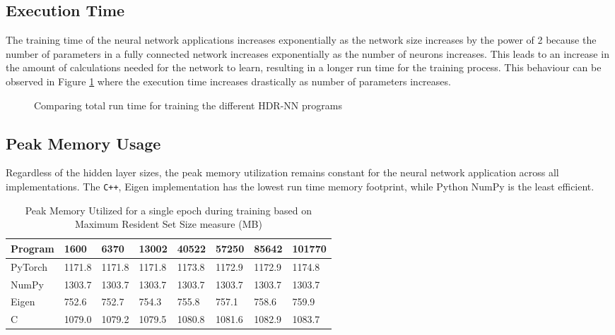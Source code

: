 \subsection{Execution Time}
The training time of the neural network applications increases exponentially as the network size increases by the power of 2 because the number of parameters in a fully connected network increases exponentially as the number of neurons increases. This leads to an increase in the amount of calculations needed for the network to learn, resulting in a longer run time for the training process. This behaviour can be observed in Figure \ref{hdrnn-exectime} where the execution time increases drastically as number of parameters increases.

\begin{figure}[!ht]
	\centering
	
	\caption[Execution Time vs Model Parameters]{Comparing total run time for training the different HDR-NN programs}
	\label{hdrnn-exectime}
\end{figure}

\subsection{Peak Memory Usage}
Regardless of the hidden layer sizes, the peak memory utilization remains constant for the neural network application across all implementations. The \texttt{C++}, Eigen implementation has the lowest run time memory footprint, while Python NumPy is the least efficient.

\begin{table}[h]
	\centering
	\begin{tabular}{ |p{4em}|p{3em}|p{3em}|p{3em}|p{3em}|p{3em}|p{3em}|p{3em}| }
		\hline
		\textbf{Program} & \textbf{1600} & \textbf{6370} & \textbf{13002} & \textbf{40522} & \textbf{57250} & \textbf{85642} & \textbf{101770} \\
		\hline
		PyTorch & 1171.8 & 1171.8 & 1171.8 & 1173.8 & 1172.9 & 1172.9 & 1174.8 \\
		\hline
		NumPy & 1303.7 & 1303.7 & 1303.7 & 1303.7 & 1303.7 & 1303.7 & 1303.7 \\
		\hline
		Eigen & 752.6 & 752.7 & 754.3 & 755.8 & 757.1 & 758.6 & 759.9 \\
		\hline
		C & 1079.0 & 1079.2 & 1079.5 & 1080.8 & 1081.6 & 1082.9 & 1083.7\\
		\hline
	\end{tabular}
	\caption[Peak Memory Utilization]{Peak Memory Utilized for a single epoch during training based on Maximum Resident Set Size measure (MB)}
\end{table}

